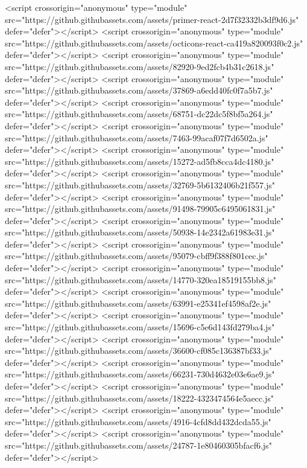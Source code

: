   <script crossorigin="anonymous" type="module" src="https://github.githubassets.com/assets/primer-react-2d7f32332b3df9d6.js" defer="defer"></script>
<script crossorigin="anonymous" type="module" src="https://github.githubassets.com/assets/octicons-react-ca419a820093f0c2.js" defer="defer"></script>
<script crossorigin="anonymous" type="module" src="https://github.githubassets.com/assets/82920-9ed2fcb4b31c2618.js" defer="defer"></script>
<script crossorigin="anonymous" type="module" src="https://github.githubassets.com/assets/37869-a6edd40fc0f7a5b7.js" defer="defer"></script>
<script crossorigin="anonymous" type="module" src="https://github.githubassets.com/assets/68751-dc22dc5f8bf5a264.js" defer="defer"></script>
<script crossorigin="anonymous" type="module" src="https://github.githubassets.com/assets/7463-99acaf07f7d6502a.js" defer="defer"></script>
<script crossorigin="anonymous" type="module" src="https://github.githubassets.com/assets/15272-ad5fb8cca4dc4180.js" defer="defer"></script>
<script crossorigin="anonymous" type="module" src="https://github.githubassets.com/assets/32769-5b6132406b21f557.js" defer="defer"></script>
<script crossorigin="anonymous" type="module" src="https://github.githubassets.com/assets/91498-79905c6495061831.js" defer="defer"></script>
<script crossorigin="anonymous" type="module" src="https://github.githubassets.com/assets/50938-14e2342a61983e31.js" defer="defer"></script>
<script crossorigin="anonymous" type="module" src="https://github.githubassets.com/assets/95079-cbff9f388f801cec.js" defer="defer"></script>
<script crossorigin="anonymous" type="module" src="https://github.githubassets.com/assets/14770-320ea18519155bb8.js" defer="defer"></script>
<script crossorigin="anonymous" type="module" src="https://github.githubassets.com/assets/63991-e25341ef4598af2e.js" defer="defer"></script>
<script crossorigin="anonymous" type="module" src="https://github.githubassets.com/assets/15696-c5e6d143fd279ba4.js" defer="defer"></script>
<script crossorigin="anonymous" type="module" src="https://github.githubassets.com/assets/36600-cf085c136387bf33.js" defer="defer"></script>
<script crossorigin="anonymous" type="module" src="https://github.githubassets.com/assets/66231-730d4632e03e6ae9.js" defer="defer"></script>
<script crossorigin="anonymous" type="module" src="https://github.githubassets.com/assets/18222-4323474564e5aecc.js" defer="defer"></script>
<script crossorigin="anonymous" type="module" src="https://github.githubassets.com/assets/4916-4cfd8dd432dcda55.js" defer="defer"></script>
<script crossorigin="anonymous" type="module" src="https://github.githubassets.com/assets/24787-1e80460305bfacf6.js" defer="defer"></script>
